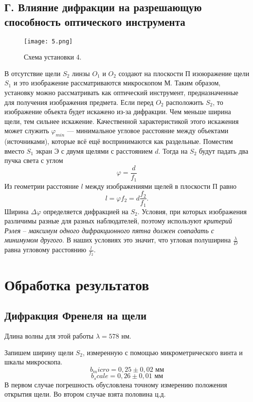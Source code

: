 \subsection*{Г. Влияние дифракции на разрешающую способность оптического инструмента}
\begin{figure}[H]
	\texttt{[image: 5.png]}
	\centering
	\caption{Схема установки 4.}
\end{figure}
В отсутствие щели $S_2$ линзы $O_1$ и $O_2$ создают на плоскости П изоюражение щели $S_1$ и это изображение рассматриваются микроскопом М. Таким образом, установку можно рассматривать как оптический инструмент, предназначенные для получения изображения предмета. Если перед $O_2$ расположить $S_2$, то изображение объекта будет искажено из-за дифракции. Чем меньше ширина щели, тем сильнее искажение. Качественной характеристикой этого искажения может служить $\varphi_{min}$ --- минимальное угловое расстояние между объектами (источниками), которые всё ещё воспринимаются как раздельные. Поместим вместо $S_1$ экран Э с двумя щелями с расстоянием $d$. Тогда на $S_2$ будут падать два пучка света с углом
\begin{equation}
\varphi = \dfrac{d}{f_1}
\end{equation}
Из геометрии расстояние $l$ между изображениями щелей в плоскости П равно 
\begin{equation}
l = \varphi f_2 = d \dfrac{f_2}{f_1}.
\end{equation}
Ширина $\Delta \varphi$ определяется дифракцией на $S_2$. Условия, при которых изображения различимы разные для разных наблюдателей, поэтому используют \textit{критерий Рэлея} -- \textit{максимум одного дифракционного пятна должен совпадать с минимумом другого}. В наших условиях это значит, что угловая полуширина $\frac{\lambda}{D}$ равна угловому расстоянию $\frac{l}{f_2}$.
\section{Обработка результатов}
\subsection{Дифракция Френеля на щели}

	Длина волны для этой работы $\lambda = 578$ нм.

	Запишем ширину щели $S_2$, измеренную с помощью микрометрического винта и шкалы микроскопа.
	\[
		b_micro = 0,25\pm0,02 \text{ мм}
	\]
	\[
		b_scale = 0,26\pm0,01 \text{ мм}
	\]
	В первом случае погрешность обусловлена точному измерению положения открытия щели. Во втором случае взята половина ц.д.
	
